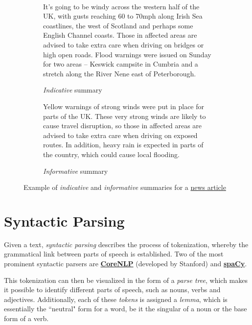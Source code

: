 \begin{figure}[H]\
\begin{subfigure}{\textwidth}
\begin{displayquote}
It’s going to be windy across the western half of the UK, with gusts reaching 60 to 70mph along Irish Sea coastlines, the west of Scotland and perhaps some English Channel coasts. Those in affected areas are advised to take extra care when driving on bridges or high open roads. Flood warnings were issued on Sunday for two areas – Keswick campsite in Cumbria and a stretch along the River Nene east of Peterborough.
\end{displayquote}
\caption{\textit{Indicative} summary}
\vspace{\baselineskip}
\end{subfigure}
\begin{subfigure}{\textwidth}
\begin{displayquote}
Yellow warnings of strong winds were put in place for parts of the UK. These very strong winds are likely to cause travel disruption, so those in affected areas are advised to take extra care when driving on exposed routes. In addition, heavy rain is expected in parts of the country, which could cause local flooding.
\caption{\textit{Informative} summary}
\end{displayquote}
\end{subfigure}
\caption{Example of \textit{indicative} and \textit{informative} summaries for a \href{https://www.theguardian.com/uk-news/2020/jan/12/storm-brendan-gales-forecast-uk}{news article}}
\label{fig:indicative_informative_summaries}
\end{figure}

\section{Syntactic Parsing}

Given a text, \textit{syntactic parsing} \cite{noauthor_syntactic_nodate} describes the process of tokenization, whereby the grammatical link between parts of speech is established.
Two of the most prominent syntactic parsers are \textbf{\href{https://corenlp.run}{CoreNLP}} (developed by Stanford) and \textbf{\href{https://spacy.io}{spaCy}}.

This tokenization can then be visualized in the form of a \textit{parse tree}, which makes it possible to identify different parts of speech, such as nouns, verbs and adjectives. Additionally, each of these \textit{tokens} is assigned a \textit{lemma}, which is essentially the ``neutral" form for a word, be it the singular of a noun or the base form of a verb.

